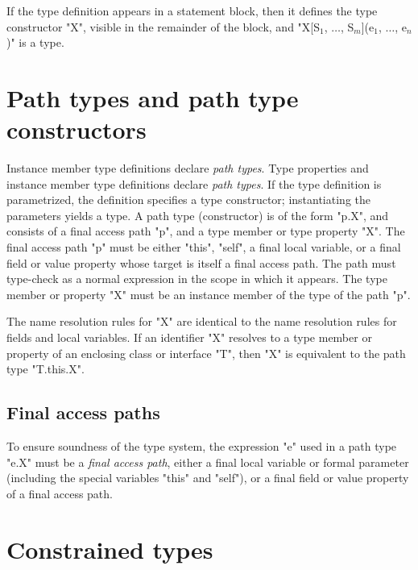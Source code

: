         If the type definition 
        appears in a statement block, then it
        defines the type constructor \xcd"X", visible in the
        remainder of the block,
and
\xcdmath"X[S$_1$, $\dots$, S$_m$](e$_1$, $\dots$, e$_n$)"
is a type.

\section{Path types and path type constructors}


\iftypeparams
Instance member type definitions declare \emph{path types}.
\else
Type properties and
instance member type definitions 
declare \emph{path types}.
\fi
If the type definition is parametrized, the definition specifies
a type constructor; instantiating the parameters yields a type.
A path type (constructor)
is of the form \xcd"p.X", and consists of a final access path
\xcd"p", and a type
member
\iftypeparams\else
or type property
\fi
\xcd"X".
The final access path \xcd"p" must be either \xcd"this", \xcd"self", a final
local variable, or a final field or value property whose target
is itself a final access path.  The path must type-check 
as a normal expression in the scope in which it appears.
The type member
\iftypeparams
or property
\fi
\xcd"X" must be an instance member of the type of the
path \xcd"p".

The name resolution rules for \xcd"X" are identical to the name
resolution rules for fields and local variables.
If an identifier \xcd"X" resolves to a type member or property
of an enclosing class or interface \xcd"T", then \xcd"X" is equivalent to
the path type \xcd"T.this.X".

\iftypeparams
\subsection{Final access paths}
\label{FinalAccessPath}

        To ensure soundness of the type system, the expression \xcd"e"
	used in a path type \xcd"e.X" must be a \emph{final access
	path}, either a final local variable or formal parameter
	(including the special variables \xcd"this" and \xcd"self"),
	or a final field or value property of a final access path.
\fi

\section{Constrained types}
\label{ConstrainedTypes}
\label{DepType:DepType}
\label{DepTypes}

